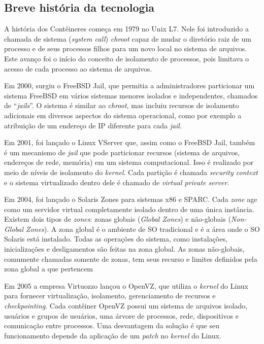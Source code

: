 	    \subsection{Breve história da tecnologia}
	    A história dos Contêineres começa em 1979 no Unix L7. Nele foi introduzido a chamada de sistema (\textit{system call}) \textit{chroot} capaz de mudar o diretório raiz de um processo e de seus processos filhos para um novo local no sistema de arquivos. Este avanço foi o início do conceito de isolamento de processos, pois limitava o acesso de cada processo ao sistema de arquivos. 

	    Em 2000, surgiu o FreeBSD Jail, que permitia a administradores particionar um sistema FreeBSD em vários sistemas menores isolados e independentes, chamados de “\textit{jails}”. O sistema é similar ao \textit{chroot}, mas incluiu recursos de isolamento adicionais em diversos aspectos do sistema operacional, como por exemplo a atribuição de um endereço de IP diferente para cada \textit{jail}. \cite{abriefhistoryofcontainers}

	    Em 2001, foi lançado o Linux VServer que, assim como o FreeBSD Jail, também é um mecanismo de \textit{jail} que pode particionar recursos (sistema de arquivos, endereços de rede, memória) em um sistema computacional. Isso é realizado por meio de níveis de isolamento do \textit{kernel}. Cada partição é chamada \textit{security context} e o sistema virtualizado dentro dele é chamado de \textit{virtual private server}. \cite{linuxvserver}

    	Em 2004, foi lançado o Solaris Zones para sistemas x86 e SPARC. Cada \textit{zone} age como um servidor virtual completamente isolado dentro de uma única instância. Existem dois tipos de \textit{zones}: zonas globais (\textit{Global Zones}) e não-globais (\textit{Non-Global Zones}). A zona global é o ambiente de SO tradicional e é a área onde o SO Solaris está instalado. Todas as operações do sistema, como instalações, inicializações e desligamentos são feitas na zona global. As zonas não-globais, comumente chamadas somente de zonas, tem seus recurso e limites definidos pela zona global a que pertencem  \cite{introductiontosolariszone}

    	Em 2005 a empresa Virtuozzo lançou o OpenVZ, que utiliza o \textit{kernel} do Linux para fornecer virtualização, isolamento, gerenciamento de recursos e \textit{checkpointing}. Cada contêiner OpenVZ possui um sistema de arquivos isolado, usuários e grupos de usuários, uma árvore de processos, rede, dispositivos e comunicação entre processos. Uma desvantagem da solução é que seu funcionamento depende da aplicação de um \textit{patch} no \textit{kernel} do Linux. \cite{openvz}

